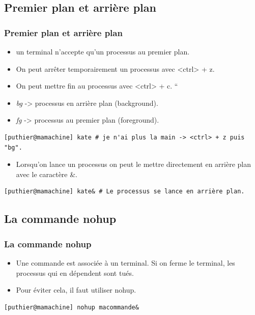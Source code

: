 \documentclass[10pt, xcolor=dvipsnames]{beamer}
\begin{document}
\subsection{Premier plan et arrière plan}
\begin{frame}[fragile]
 \frametitle{Premier plan et arrière plan}
\begin{itemize}
\item un terminal n'accepte qu'un processus au premier plan. 
\item On peut arrêter  temporairement un processus avec <ctrl> + z. 
\item On peut mettre fin au processus avec <ctrl> + c.                                                   ``
\item \textit{bg} -> processus en arrière plan (background).
\item \textit{fg} -> processus au premier plan (foreground).
\end{itemize}


\begin{scriptsize}
\begin{verbatim}
[puthier@mamachine] kate # je n'ai plus la main -> <ctrl> + z puis "bg".
\end{verbatim}
\end{scriptsize}

\begin{itemize}
\item Lorsqu'on lance un processus on peut le mettre directement en arrière plan avec le caractère \&.
\end{itemize}

\begin{scriptsize}
\begin{verbatim}
[puthier@mamachine] kate& # Le processus se lance en arrière plan.
\end{verbatim}
\end{scriptsize}

\end{frame}



\subsection{La commande nohup}
\begin{frame}[fragile]
 \frametitle{La commande nohup}
\begin{itemize}
\item Une commande est associée à un terminal. Si on ferme le terminal, les processus qui en dépendent sont tués.
\item Pour éviter cela, il faut utiliser nohup.

\end{itemize}


\begin{scriptsize}
\begin{verbatim}
[puthier@mamachine] nohup macommande&
\end{verbatim}
\end{scriptsize}

\end{frame}
\end{document}
